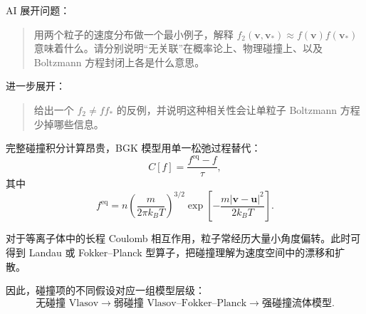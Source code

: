 \begin{askai}
AI 展开问题：
\begin{quote}
用两个粒子的速度分布做一个最小例子，解释 \(f_2(\bm v,\bm v_*)\approx f(\bm v)f(\bm v_*)\) 意味着什么。请分别说明“无关联”在概率论上、物理碰撞上、以及 Boltzmann 方程封闭上各是什么意思。
\end{quote}

进一步展开：
\begin{quote}
给出一个 \(f_2\neq f f_*\) 的反例，并说明这种相关性会让单粒子 Boltzmann 方程少掉哪些信息。
\end{quote}
\end{askai}

完整碰撞积分计算昂贵，BGK 模型用单一松弛过程替代：
\[
C[f]=\frac{f^{\mathrm{eq}}-f}{\tau},
\]
其中
\[
f^{\mathrm{eq}}
=
n\left(\frac{m}{2\pi k_BT}\right)^{3/2}
\exp\left[
-\frac{m|\bm v-\bm u|^2}{2k_BT}
\right].
\]

对于等离子体中的长程 Coulomb 相互作用，粒子常经历大量小角度偏转。此时可得到 Landau 或 Fokker--Planck 型算子，把碰撞理解为速度空间中的漂移和扩散。

因此，碰撞项的不同假设对应一组模型层级：
\[
\text{无碰撞 Vlasov}
\longrightarrow
\text{弱碰撞 Vlasov--Fokker--Planck}
\longrightarrow
\text{强碰撞流体模型}.
\]

